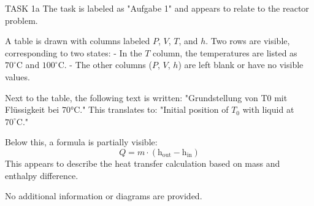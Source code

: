 TASK 1a  
The task is labeled as "Aufgabe 1" and appears to relate to the reactor problem.  

A table is drawn with columns labeled \( P \), \( V \), \( T \), and \( h \). Two rows are visible, corresponding to two states:  
- In the \( T \) column, the temperatures are listed as \( 70^\circ\text{C} \) and \( 100^\circ\text{C} \).  
- The other columns (\( P \), \( V \), \( h \)) are left blank or have no visible values.  

Next to the table, the following text is written:  
"Grundstellung von T0 mit Flüssigkeit bei 70°C."  
This translates to: "Initial position of \( T_0 \) with liquid at \( 70^\circ\text{C} \)."  

Below this, a formula is partially visible:  
\[
Q = m \cdot (\text{h}_{\text{out}} - \text{h}_{\text{in}})
\]  
This appears to describe the heat transfer calculation based on mass and enthalpy difference.  

No additional information or diagrams are provided.